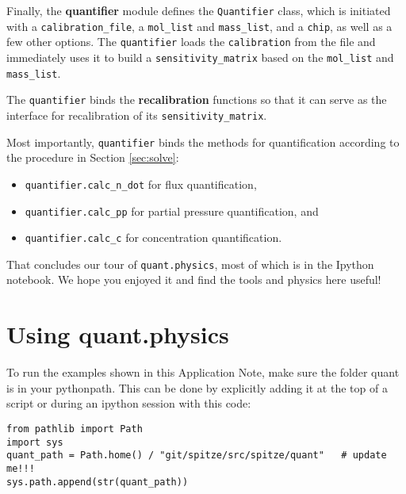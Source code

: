 \documentclass{article}
\newcommand{\code}[1]{\colorbox{codegray}{\lstinline{#1}}}
\begin{document}
Finally, the \textbf{quantifier} module defines the \code{Quantifier} class, which is initiated with a \code{calibration_file}, a \code{mol_list} and \code{mass_list}, and a \code{chip}, as well as a few other options. The \code{quantifier} loads the \code{calibration} from the file and immediately uses it to build a \code{sensitivity_matrix} based on the \code{mol_list} and \code{mass_list}. 

The \code{quantifier} binds the \textbf{recalibration} functions so that it can serve as the interface for recalibration of its \code{sensitivity_matrix}. 

Most importantly, \code{quantifier} binds the methods for quantification according to the procedure in Section \ref{sec:solve}:
\begin{itemize}
	\item \code{quantifier.calc_n_dot} for flux quantification,
	
	\item \code{quantifier.calc_pp} for partial pressure quantification, and
	
	\item \code{quantifier.calc_c} for concentration quantification.
\end{itemize}

That concludes our tour of \code{quant.physics}, most of which is in the Ipython notebook. We hope you enjoyed it and find the tools and physics here useful!

\section{Using \textbf{quant.physics}} \label{sec:usage}

To run the examples shown in this Application Note, make sure the folder quant is in your pythonpath. This can be done by explicitly adding it at the top of a script or during an ipython session with this code:

\begin{lstlisting}
from pathlib import Path
import sys
quant_path = Path.home() / "git/spitze/src/spitze/quant"   # update me!!!
sys.path.append(str(quant_path))
\end{lstlisting}
\end{document}
